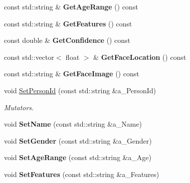 \begin{DoxyCompactItemize}
const std\+::string \& {\bfseries Get\+Age\+Range} () const
\item 
\mbox{\label{class_person_a521d614a46e1cc2347f1e914bbd36030}} 
const std\+::string \& {\bfseries Get\+Features} () const
\item 
\mbox{\label{class_person_a204fbbdf8beaecc8b466d8e8db54f83d}} 
const double \& {\bfseries Get\+Confidence} () const
\item 
\mbox{\label{class_person_af487ee9d16d9b94dc76614a70e7d5e3b}} 
const std\+::vector$<$ float $>$ \& {\bfseries Get\+Face\+Location} () const
\item 
\mbox{\label{class_person_a68d5b695873d47f3cfcb6da1a7d076ce}} 
const std\+::string \& {\bfseries Get\+Face\+Image} () const
\item 
\mbox{\label{class_person_a8431cf906d005de0c0050fa3d885a864}} 
void \hyperlink{class_person_a8431cf906d005de0c0050fa3d885a864}{Set\+Person\+Id} (const std\+::string \&a\+\_\+\+Person\+Id)
\begin{DoxyCompactList}\small\item\em Mutators. \end{DoxyCompactList}\item 
\mbox{\label{class_person_a11108755294db672b104e4b89d7948ea}} 
void {\bfseries Set\+Name} (const std\+::string \&a\+\_\+\+Name)
\item 
\mbox{\label{class_person_aa6256de77cce93b3c4deb34f5a7acccd}} 
void {\bfseries Set\+Gender} (const std\+::string \&a\+\_\+\+Gender)
\item 
\mbox{\label{class_person_a60582729800507c0c3caa4a4bd35c9d9}} 
void {\bfseries Set\+Age\+Range} (const std\+::string \&a\+\_\+\+Age)
\item 
\mbox{\label{class_person_a7e6e69193377849063c8e63da8aa0fcf}} 
void {\bfseries Set\+Features} (const std\+::string \&a\+\_\+\+Features)
\item 
\mbox{\label{class_person_a5640a80798887d825f27899ab623ea55}} 

\end{DoxyCompactItemize}

